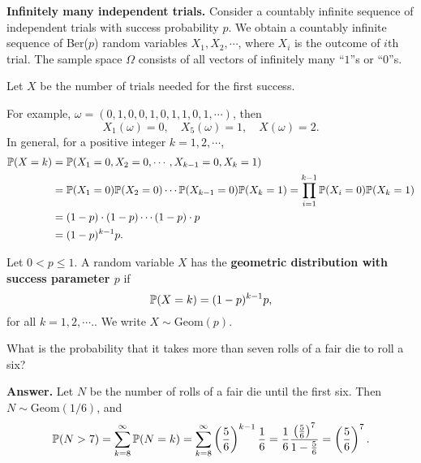 \textbf{Infinitely many independent trials.} Consider a countably infinite
sequence of independent trials with success probability $p$. We obtain a
countably infinite sequence of Ber($p$) random variables $X_1, X_2,\cdots$,
where $X_i$ is the outcome of $i$th trial. The sample space $\Omega$ consists of
all vectors of infinitely many ``$1$''s or ``$0$''s.

Let $X$ be the number of trials needed for the first success. 

For example, $\omega = (0,1,0,0,1,0,1,1,0,1,\cdots)$, then
\[
  X_1(\omega) = 0, \quad X_5(\omega) = 1,\quad X(\omega) =2.
\]
In general, for a positive integer $k=1,2,\cdots$,
\begin{align*}
  \mathbb{P}(X = k) & = \mathbb{P}(X_1 =0, X_2=0, \cdots, X_{k-1}=0, X_k=1)\\
             & = \mathbb{P}(X_1=0)\mathbb{P}(X_2 = 0)\cdots \mathbb{P}(X_{k-1}=0)\mathbb{P}(X_k=1) = \prod_{i=1}^{k-1}\mathbb{P}(X_i=0)\mathbb{P}(X_k=1)\\
             & = (1-p)\cdot(1-p)\cdots (1-p)\cdot p\\
  & = (1-p)^{k-1}p.
\end{align*}
\begin{definition}
  Let $0< p\le 1$. A random variable $X$ has the \textbf{geometric
    distribution with success parameter $p$} if
  \[
    \mathbb{P}(X = k) = (1-p)^{k-1} p,
  \]
  for all $k=1,2,\cdots.$.
  We write $X\sim\text{Geom}(p)$.
\end{definition}
\begin{example}
  What is the probability that it takes more than seven rolls of a fair die to
  roll a six?
\end{example}
\textbf{Answer.} Let $N$ be the number of rolls of a fair die until the first
six. Then $N\sim\text{Geom}(1/6)$, and
\[
  \mathbb{P}(N>7) = \sum_{k=8}^\infty \mathbb{P}(N=k) =
  \sum_{k=8}^\infty\left(\frac{5}{6}\right)^{k-1}\frac{1}{6} =
  \frac{1}{6}\frac{\left(\frac{5}{6}\right)^7}{1-\frac{5}{6}} = \left(\frac{5}{6}\right)^7.
\]


